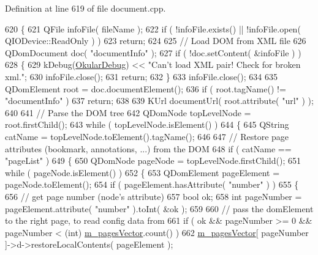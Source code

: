 Definition at line 619 of file document.\+cpp.


\begin{DoxyCode}
620 \{
621     QFile infoFile( fileName );
622     \textcolor{keywordflow}{if} ( !infoFile.exists() || !infoFile.open( QIODevice::ReadOnly ) )
623         \textcolor{keywordflow}{return};
624 
625     \textcolor{comment}{// Load DOM from XML file}
626     QDomDocument doc( \textcolor{stringliteral}{"documentInfo"} );
627     \textcolor{keywordflow}{if} ( !doc.setContent( &infoFile ) )
628     \{
629         kDebug(\hyperlink{debug__p_8h_af16c6e32a95969dd0605d792ec9807c7}{OkularDebug}) << \textcolor{stringliteral}{"Can't load XML pair! Check for broken xml."};
630         infoFile.close();
631         \textcolor{keywordflow}{return};
632     \}
633     infoFile.close();
634 
635     QDomElement root = doc.documentElement();
636     \textcolor{keywordflow}{if} ( root.tagName() != \textcolor{stringliteral}{"documentInfo"} )
637         \textcolor{keywordflow}{return};
638 
639     KUrl documentUrl( root.attribute( \textcolor{stringliteral}{"url"} ) );
640 
641     \textcolor{comment}{// Parse the DOM tree}
642     QDomNode topLevelNode = root.firstChild();
643     \textcolor{keywordflow}{while} ( topLevelNode.isElement() )
644     \{
645         QString catName = topLevelNode.toElement().tagName();
646 
647         \textcolor{comment}{// Restore page attributes (bookmark, annotations, ...) from the DOM}
648         \textcolor{keywordflow}{if} ( catName == \textcolor{stringliteral}{"pageList"} )
649         \{
650             QDomNode pageNode = topLevelNode.firstChild();
651             \textcolor{keywordflow}{while} ( pageNode.isElement() )
652             \{
653                 QDomElement pageElement = pageNode.toElement();
654                 \textcolor{keywordflow}{if} ( pageElement.hasAttribute( \textcolor{stringliteral}{"number"} ) )
655                 \{
656                     \textcolor{comment}{// get page number (node's attribute)}
657                     \textcolor{keywordtype}{bool} ok;
658                     \textcolor{keywordtype}{int} pageNumber = pageElement.attribute( \textcolor{stringliteral}{"number"} ).toInt( &ok );
659 
660                     \textcolor{comment}{// pass the domElement to the right page, to read config data from}
661                     \textcolor{keywordflow}{if} ( ok && pageNumber >= 0 && pageNumber < (\textcolor{keywordtype}{int})
      \hyperlink{classOkular_1_1DocumentPrivate_a73b852d9a73ffe8061b66dbf9b290f17}{m\_pagesVector}.count() )
662                         \hyperlink{classOkular_1_1DocumentPrivate_a73b852d9a73ffe8061b66dbf9b290f17}{m\_pagesVector}[ pageNumber ]->d->restoreLocalContents( pageElement );

\end{DoxyCode}
